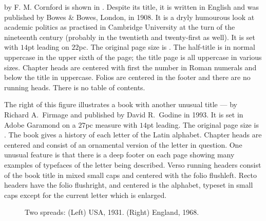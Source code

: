 \documentclass[10pt,a4paper,extrafontsizes]{memoir}
\begin{document}
\begin{paracol}{2}
\switchEng
     by F. M. Cornford is shown in
. Despite its title, it is written in English and was published
by Bowes \& Bowes, London, in 1908. It is a dryly humourous look at academic
politics as practised in Cambridge University at the turn of the nineteenth
century (probably in the twentieth and twenty-first as well). 
It is set with $14$pt leading
on $22$pc. The original page size is .
The half-title 
is in normal uppercase in the upper
sixth of the page; the title page is all uppercase in
various sizes. Chapter heads are centered with first 
the number in Roman numerals and below the title in uppercase.
Folios are centered in the footer 
and there are no running heads. There is no table of contents.



The right of this figure illustrates a book with another unusual title ---
 by Richard A.~Firmage and published by
David R.~Godine in 1993. It is set in 
Adobe Garamond on a $27$pc measure
with $14$pt leading. The original page size is . The
book gives a history of each letter of the Latin alphabet. 
Chapter heads are centered and consist of an 
ornamental version of the letter in question. One
unusual feature is that there is a deep footer 
on each page showing many examples of typefaces of the letter being 
described. Verso running headers consist of the book
title in mixed small caps and centered with the folio flushleft.
Recto headers have the folio flushright, and centered is the alphabet, 
typeset in small caps except for the current letter which is enlarged.
\end{paracol}

\begin{figure}
\centering
\begin{minipage}[b]{\pwlayi}
\end{minipage}
\hfill
\begin{minipage}[b]{\pwlayi}
\end{minipage}
\caption[Two spreads: USA, 1931 and England, 1968]%
        {Two spreads: (Left) USA, 1931.
         (Right) England, 1968.} \label{fb:6}
\end{figure}
\end{document}
